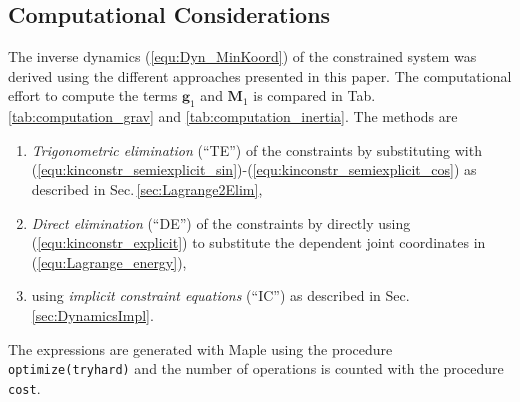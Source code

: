 \documentclass[twocolumn,10pt]{IFTOMM}
\newcommand{\bm}[1]{\boldsymbol{#1}}
\begin{document}

\subsection{Computational Considerations}

The inverse dynamics (\ref{equ:Dyn_MinKoord}) of the constrained system was derived using the different approaches presented in this paper.
The computational effort to compute the terms $\bm{g}_1$ and $\bm{M}_1$ is compared in Tab.\,\ref{tab:computation_grav} and \ref{tab:computation_inertia}.
The methods are 
%
\begin{enumerate}
    \item \emph{Trigonometric elimination} (``TE'') of the constraints by substituting with (\ref{equ:kinconstr_semiexplicit_sin})-(\ref{equ:kinconstr_semiexplicit_cos}) as described in Sec.\,\ref{sec:Lagrange2Elim}, 
    \item \emph{Direct elimination} (``DE'') of the constraints by directly using (\ref{equ:kinconstr_explicit}) to substitute the dependent joint coordinates in (\ref{equ:Lagrange_energy}),
    \item using \emph{implicit constraint equations} (``IC'') as described in Sec.\,\ref{sec:DynamicsImpl}.
\end{enumerate}
%
The expressions are generated with Maple using the procedure \texttt{optimize(tryhard)} and the number of operations is counted with the procedure \texttt{cost}.
%
\end{document}
